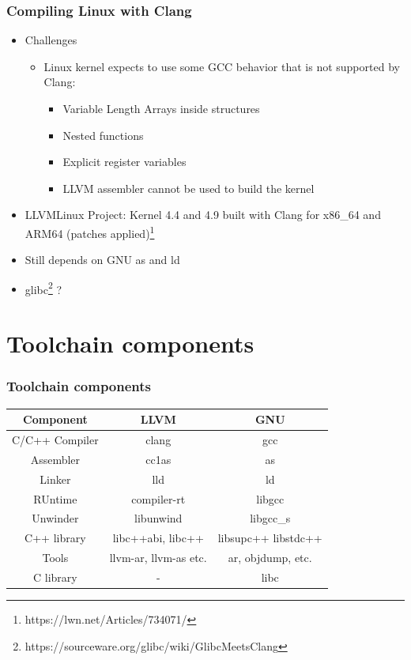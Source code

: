 \documentclass{beamer}
\begin{document}
\begin{frame}
\frametitle{Compiling Linux with Clang}
\begin{itemize}
  \item Challenges
  \begin{itemize}
    \item Linux kernel expects to use some GCC behavior that is not supported by Clang:
    \begin{itemize}
      \item Variable Length Arrays inside structures
      \item Nested functions
      \item Explicit register variables
      \item LLVM assembler cannot be used to build the kernel
    \end{itemize}
  \end{itemize}
  \item LLVMLinux Project: Kernel 4.4 and 4.9 built with Clang for x86\_64 and ARM64
  (patches applied)\footnote{https://lwn.net/Articles/734071/}
  \item Still depends on GNU {\selectfont as} and {\selectfont ld}
  \item glibc\footnote{https://sourceware.org/glibc/wiki/GlibcMeetsClang} ?
\end{itemize}
\end{frame}

\section{Toolchain components}
\begin{frame}
\frametitle{Toolchain components}
\centering
  \begin{tabular}{c|c|c}
  \textbf{Component} & \textbf{LLVM} & \textbf{GNU} \\
  \hline
  C/C++ Compiler & clang & gcc \\
  Assembler & cc1as & as \\
  Linker & lld & ld \\
  RUntime & compiler-rt & libgcc \\
  Unwinder & libunwind & libgcc\_s \\
  C++ library & libc++abi, libc++ & libsupc++ libstdc++ \\
  Tools & llvm-ar, llvm-as etc. & ar, objdump, etc. \\
  C library & - & libc \\
  \end{tabular}
\end{frame}
\end{document}
